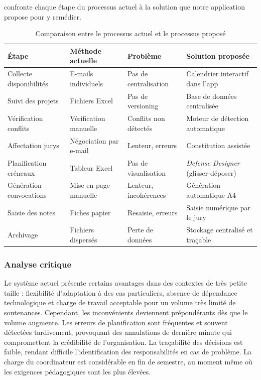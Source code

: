  confronte chaque étape du processus actuel à la solution que notre application propose pour y remédier.

\begin{table}[H]
    \centering
    \small
    \begin{xltabular}{\textwidth}{XXXX}
        \toprule

        \textbf{Étape}          & \textbf{Méthode actuelle} & \textbf{Problème}     & \textbf{Solution proposée}         \\
        \midrule
        Collecte disponibilités & E-mails individuels       & Pas de centralisation & Calendrier interactif dans l'app   \\
        Suivi des projets       & Fichiers Excel            & Pas de versioning     & Base de données centralisée        \\
        Vérification conflits   & Vérification manuelle     & Conflits non détectés & Moteur de détection automatique    \\
        Affectation jurys       & Négociation par e-mail    & Lenteur, erreurs      & Constitution assistée              \\
        Planification créneaux  & Tableur Excel             & Pas de visualisation  & \textit{Defense Designer} (glisser-déposer) \\
        Génération convocations & Mise en page manuelle     & Lenteur, incohérences & Génération automatique A4          \\
        Saisie des notes        & Fiches papier             & Resaisie, erreurs     & Saisie numérique par le jury       \\
        Archivage               & Fichiers dispersés        & Perte de données      & Stockage centralisé et traçable    \\
        \bottomrule
    \end{xltabular}
    \caption{Comparaison entre le processus actuel et le processus proposé}
    \label{tab:comparaison_processus}
\end{table}

\subsubsection{Analyse critique}
\label{ch2:analyse_critique}

Le système actuel présente certains avantages dans des contextes de très petite taille : flexibilité d'adaptation à des cas particuliers, absence de dépendance technologique et charge de travail acceptable pour un volume très limité de soutenances. Cependant, les inconvénients deviennent prépondérants dès que le volume augmente. Les erreurs de planification sont fréquentes et souvent détectées tardivement, provoquant des annulations de dernière minute qui compromettent la crédibilité de l'organisation. La traçabilité des décisions est faible, rendant difficile l'identification des responsabilités en cas de problème. La charge du coordinateur est considérable en fin de semestre, au moment même où les exigences pédagogiques sont les plus élevées.


